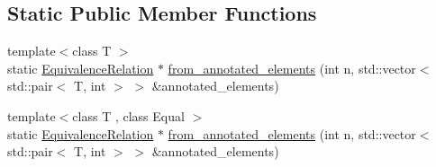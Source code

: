 \subsection*{Static Public Member Functions}
\begin{DoxyCompactItemize}
\item 
{\footnotesize template$<$class T $>$ }\\static \hyperlink{classEquivalenceRelation}{Equivalence\-Relation} $\ast$ \hyperlink{classEquivalenceRelation_af058c58f4f2d6c7825500ad217b37125}{from\-\_\-annotated\-\_\-elements} (int n, std\-::vector$<$ std\-::pair$<$ T, int $>$ $>$ \&annotated\-\_\-elements)
\item 
{\footnotesize template$<$class T , class Equal $>$ }\\static \hyperlink{classEquivalenceRelation}{Equivalence\-Relation} $\ast$ \hyperlink{classEquivalenceRelation_af48b8e6a749b47b975a917cf6bafc1e5}{from\-\_\-annotated\-\_\-elements} (int n, std\-::vector$<$ std\-::pair$<$ T, int $>$ $>$ \&annotated\-\_\-elements)
\end{DoxyCompactItemize}


